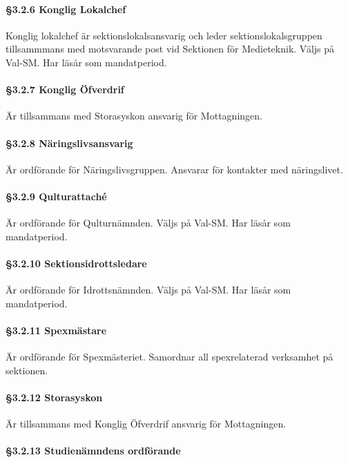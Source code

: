 \paragraph{§3.2.6 Konglig Lokalchef}

Konglig lokalchef är sektionslokalsansvarig och leder sektionslokalsgruppen tillsammmans med motsvarande post vid Sektionen för Medieteknik. Väljs på Val-SM. Har läsår som mandatperiod.

\paragraph{§3.2.7 Konglig Öfverdrif}

Är tillsammans med Storasyskon ansvarig för Mottagningen.

\paragraph{§3.2.8 Näringslivsansvarig}

Är ordförande för Näringslivsgruppen. Ansvarar för kontakter med näringslivet.

\paragraph{§3.2.9 Qulturattaché}

Är ordförande för Qulturnämnden. Väljs på Val-SM. Har läsår som mandatperiod.

\paragraph{§3.2.10 Sektionsidrottsledare}

Är ordförande för Idrottsnämnden. Väljs på Val-SM. Har läsår som mandatperiod.

\paragraph{§3.2.11 Spexmästare}

Är ordförande för Spexmästeriet. Samordnar all spexrelaterad verksamhet på sektionen.

\paragraph{§3.2.12 Storasyskon}

Är tillsammans med Konglig Öfverdrif ansvarig för Mottagningen.

\paragraph{§3.2.13 Studienämndens ordförande}


